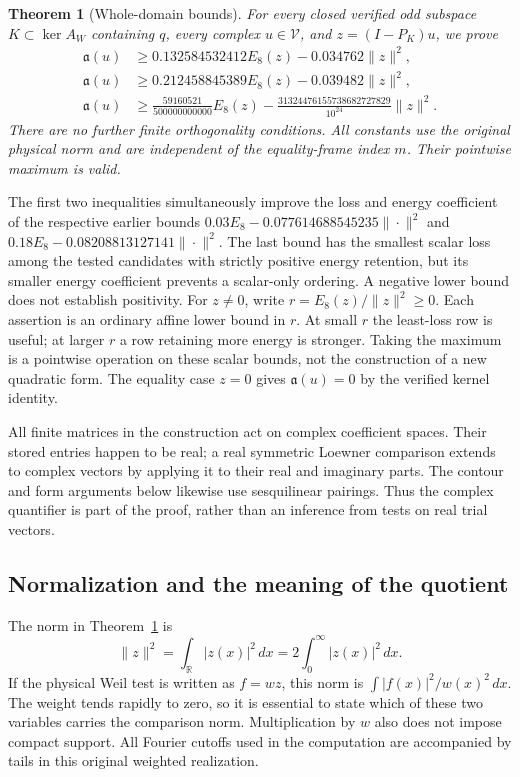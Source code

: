 \documentclass[12pt]{article}
\newtheorem{theorem}{Theorem}[section]
\theoremstyle{remark}\newtheorem{remark}[theorem]{Remark}
\newcommand{\dd}{\,d}
\begin{document}
\begin{theorem}[Whole-domain bounds]\label{main}
For every closed verified odd subspace $K\subset\ker A_W$ containing
$q$, every complex $u\in\mathcal V$, and $z=(I-P_K)u$, we prove
\begin{align*}
 \mathfrak a(u)&\ge 0.132584532412 E_8(z)
             -0.034762\|z\|^2,\\
 \mathfrak a(u)&\ge 0.212458845389 E_8(z)
             -0.039482\|z\|^2,\\
 \mathfrak a(u)&\ge\frac{59160521}{500000000000} E_8(z)
             -\frac{31324476155738682727829}{10^{24}}\|z\|^2.
\end{align*}
There are no further finite orthogonality conditions. All constants
use the original physical norm and are independent of the equality-frame
index $m$. Their pointwise maximum is valid.
\end{theorem}
The first two inequalities simultaneously improve the loss and energy
coefficient of the respective earlier bounds
$0.03E_8-0.077614688545235\|\cdot\|^2$ and
$0.18E_8-0.08208813127141\|\cdot\|^2$.
The last bound has the smallest scalar loss among the tested candidates
with strictly positive energy retention,
but its smaller energy coefficient prevents a scalar-only ordering.
A negative lower bound does not establish positivity.
For $z\ne0$, write $r=E_8(z)/\|z\|^2\ge0$. Each assertion is an
ordinary affine lower bound in $r$. At small $r$ the least-loss row is
useful; at larger $r$ a row retaining more energy is stronger. Taking
the maximum is a pointwise operation on these scalar bounds, not the
construction of a new quadratic form. The equality case $z=0$ gives
$\mathfrak a(u)=0$ by the verified kernel identity.

All finite matrices in the construction act on complex coefficient
spaces. Their stored entries happen to be real; a real symmetric
Loewner comparison extends to complex vectors by applying it to their
real and imaginary parts. The contour and form arguments below likewise
use sesquilinear pairings. Thus the complex quantifier is part of the
proof, rather than an inference from tests on real trial vectors.


\subsection{Normalization and the meaning of the quotient}
The norm in Theorem~\ref{main} is
\[
 \|z\|^2=\int_{\mathbb R}|z(x)|^2\dd x
         =2\int_0^\infty|z(x)|^2\dd x.
\]
If the physical Weil test is written as $f=wz$, this norm is
$\int |f(x)|^2/w(x)^2\dd x$. The weight tends rapidly to zero, so
it is essential to state which of these two variables carries the
comparison norm. Multiplication by $w$ also does not impose compact
support. All Fourier cutoffs used in the computation are accompanied
by tails in this original weighted realization.
\end{document}
